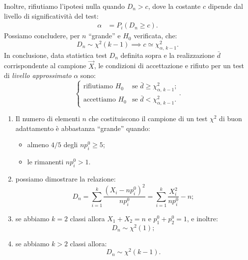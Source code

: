 \begin{defn}
            Inoltre, rifiutiamo l'ipotesi nulla quando $D_n > c$, dove la costante $c$ dipende 
            dal livello di significatività del test:
            \begin{align*}
                \alpha &= P_i\left(D_n \geq c\right)
            .\end{align*}
            Possiamo concludere, per $n$ ``grande'' e $H_0$ verificata, che: \[
                D_n \sim \chi^2(k-1) \implies c \simeq \chi^2_{\alpha,\, k-1}
            .\] In conclusione, data statistica test $D_n$ definita sopra e la realizzazione 
            $\bar{d}$ corrispondente al campione $\vec{X}$, le condizioni di accettazione e 
            rifiuto per un test di \emph{livello approssimato} $\alpha$ sono: \[
                \begin{cases}
                    \text{rifiutiamo } H_0 & 
                    \text{se $\bar{d} \geq \chi^2_{\alpha,\, k-1}$;} \\
                    \text{accettiamo } H_0 & 
                    \text{se $\bar{d} < \chi^2_{\alpha,\, k-1}$.}
                \end{cases}
            .\] 
        \end{defn}
        \begin{prty}
            \hfill
            \begin{enumerate}
                \item Il numero di elementi $n$ che costituiscono il campione di un test $\chi^2$ 
                    di buon adattamento è abbastanza ``grande'' quando:
                    \begin{itemize} \label{itm:n_grande_Chi_quadro_adattamento}
                        \item almeno $4 /5$ degli $np_i^0 \geq 5$;
                        \item le rimanenti $np_i^0 > 1$.
                    \end{itemize}
                \item possiamo dimostrare la relazione: \[
                    D_n = \sum_{i=1}^{k} \frac{(X_i -np_i^0)^2}{np_i^0} = 
                    \sum_{i=1}^{k} \frac{X_i^2}{np_i^0}-n
                ;\] 
                \item se abbiamo $k=2$ classi allora $X_1+X_2=n$ e $p_1^0+p_2^0=1$, e inoltre: \[
                    D_n \sim \chi^2(1)
                ;\] 
                \item se abbiamo $k > 2$ classi allora: \[
                    D_n \sim \chi^2(k-1)
                .\] 
            \end{enumerate}
        \end{prty}

